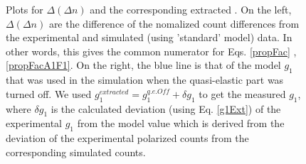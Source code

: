 \begin{figure}[h]
\centering
\label{dDnCSng1q7} %
\caption[Optional caption for list of figures]{Plots for $\Delta (\Delta n)$ and the corresponding extracted \gone. On the left, $\Delta (\Delta n)$ are the difference of the nomalized count differences  from the experimental and simulated (using 'standard' model) data. In other words, this gives the common numerator for Eqs. \ref{propFac} , \ref{propFacA1F1}. On the right, the blue line is that of the model $g_1$ that was used in the simulation when the quasi-elastic part was turned off. We used $g_1^{extracted} = g_1^{q.e. Off} + \delta g_1$ to get the measured $g_1$, where $\delta g_1$ is the calculated deviation (using Eq. \ref{g1Ext}) of the experimental $g_1$ from the model value which is derived from the deviation of the experimental polarized counts from the corresponding simulated counts.}
\end{figure}





